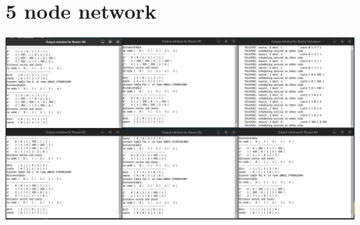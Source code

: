 \documentclass[a4paper,11pt,final]{report}
\begin{document}
\section{5 node network}

\includegraphics[width=\linewidth]{upload_1e6ba73192c8a539ba86155485f419e3.png}
\end{document}
